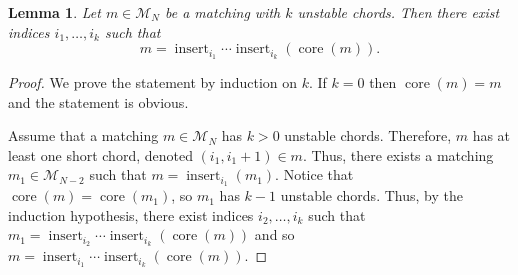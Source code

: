 \documentclass[11pt]{article}
\newtheorem{lemma}[theo]{Lemma}
\theoremstyle{definition}
\numberwithin{equation}{section}
\newcommand{\core}{\operatorname{core}}
\newcommand{\insrt}{\operatorname{insert}}
\newcommand{\M}{\mathcal{M}}
\begin{document}
\begin{lemma}
\label{lem:matching is generated by inserts to its core}
    Let $m \in \M_N$ be a matching with $k$ unstable chords. Then there exist indices $i_1, \dots, i_k$ such that
    \[
        m = \insrt_{i_1}\cdots\insrt_{i_k}(\core(m)).
    \]
\end{lemma}

\begin{proof}
    We prove the statement by induction on $k$. If $k=0$ then $\core(m) = m$ and the statement is obvious.

    Assume that a matching $m \in \M_N$ has $k > 0$ unstable chords. Therefore, $m$ has at least one short chord, denoted $(i_1,i_1+1) \in m$. Thus, there exists a matching $m_1 \in \M_{N-2}$ such that $m = \insrt_{i_1}(m_1)$. Notice that $\core(m) = \core(m_1)$, so $m_1$ has $k-1$ unstable chords. Thus, by the induction hypothesis, there exist indices $i_2,\dots,i_k$ such that $m_1 = \insrt_{i_2}\cdots\insrt_{i_k}(\core(m))$ and so $m = \insrt_{i_1}\cdots\insrt_{i_k}(\core(m))$.
\end{proof}
\end{document}
